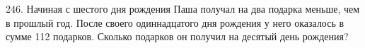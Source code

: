 246. Начиная с шестого дня рождения Паша получал на два подарка меньше, чем в прошлый год. После своего одиннадцатого дня рождения у него оказалось в сумме 112 подарков. Сколько подарков он получил на десятый день рождения?\\
